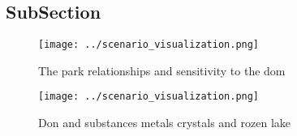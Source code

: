 \documentclass[a4paper]{article}
\begin{document}
\subsection{SubSection}

\begin{figure}
\centering
\texttt{[image: ../scenario\_visualization.png]}
\caption{The park relationships and sensitivity to the dom
}
\end{figure}
 
\begin{figure}
\centering
\texttt{[image: ../scenario\_visualization.png]}
\caption{Don and substances metals crystals and rozen lake
}
\end{figure}
 
\end{document}
